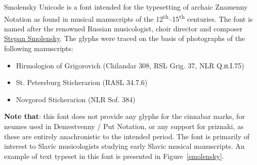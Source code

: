 \documentclass[11pt]{article}
\begin{document}
Smolensky Unicode is a font intended for the typesetting of archaic Znamenny Notation
as found in musical manuscripts of the 12\textsuperscript{th}--15\textsuperscript{th}
centuries. The font is named after the renowned Russian musicologist,
choir director and composer
\href{https://en.wikipedia.org/wiki/Stepan_Smolensky}{Stepan Smolensky}.
The glyphs were traced on the basis of photographs of the following manuscripts:

\begin{itemize}
\item Hirmologion of Grigorovich (Chilandar 308, RSL Grig. 37, NLR Q.п.I.75)
\item St. Petersburg Sticherarion (RASL 34.7.6)
\item Novgorod Sticherarion (NLR Sof. 384)
\end{itemize}

\textbf{Note that}: this font does not provide any glyphs for the cinnabar marks,
for neumes used in Demestvenny / Put Notation, or any support for priznaki, as these
are entirely anachronistic to the intended period. The font is primarily of
interest to Slavic musicologists studying early Slavic musical manuscripts.
An example of text typeset in this font is presented in Figure~\ref{smolensky}.

\clearpage
{}
{}

\end{document}
